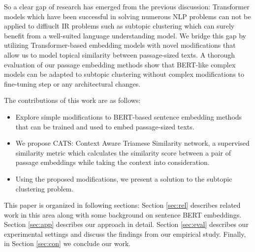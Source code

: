 So a clear gap of research has emerged from the previous discussion: Transformer models which have been successful in solving numerous NLP problems can not be applied to diffiuclt IR problems such as subtopic clustering which can surely benefit from a well-suited language understanding model. We bridge this gap by utilizing Transformer-based embedding models with novel modifications that allow us to model topical similarity between passage-sized texts. A thorough evaluation of our passage embedding methods show that BERT-like complex models can be adapted to subtopic clustering without complex modifications to fine-tuning step or any architectural changes.

The contributions of this work are as follows:

\begin{itemize}
    \item Explore simple modifications to BERT-based sentence embedding methods that can be trained and used to embed passage-sized texts.
    \item We propose CATS: Context Aware Triamese Similarity network, a supervised similarity metric which calculates the similarity score between a pair of passage embeddings while taking the context into consideration.
    \item Using the proposed modifications, we present a solution to the subtopic clustering problem.
\end{itemize}

This paper is organized in following sections: Section \ref{sec:rel} describes related work in this area along with some background on sentence BERT embeddings. Section \ref{sec:app} describes our approach in detail. Section \ref{sec:eval} describes our experimental settings and discuss the findings from our empirical study. Finally, in Section \ref{sec:con} we conclude our work.

